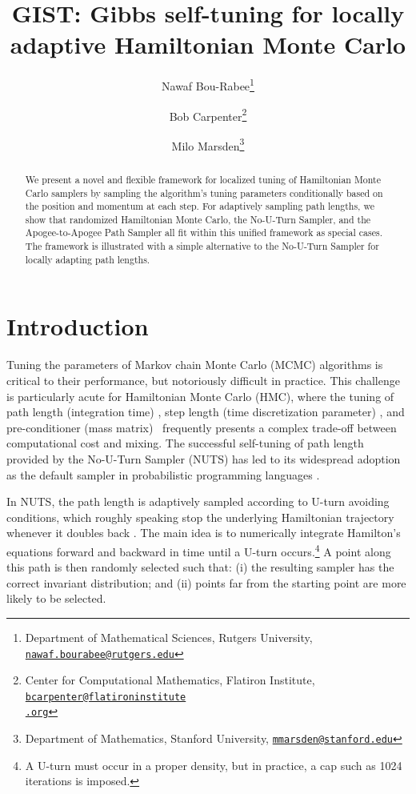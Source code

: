 \documentclass[letterpaper,11pt]{article}
\title{GIST: Gibbs self-tuning for locally  \\ 
adaptive Hamiltonian Monte Carlo}
\author{Nawaf Bou-Rabee\thanks{Department of Mathematical Sciences, Rutgers University, \href{mailto:nawaf.bourabee@rutgers.edu}{\texttt{nawaf.bourabee@rutgers.edu}}}
\and
Bob Carpenter\thanks{Center for Computational Mathematics, Flatiron Institute, \href{mailto:bcarpenter@flatironinstitute.org}{\texttt{bcarpenter@flatironinstitute\\.org}}}
\and
Milo Marsden\thanks{Department of Mathematics, Stanford University, 
\href{mailto:mmarsden@stanford.edu}{\texttt{mmarsden@stanford.edu}}}
}
\theoremstyle{plain}%
\theoremstyle{remark}
\begin{document}
\maketitle
\begin{abstract}
\noindent
We present a novel and flexible framework for localized tuning of Hamiltonian Monte Carlo samplers by sampling the algorithm's tuning parameters conditionally based on the position and momentum at each step. For adaptively sampling path lengths, we show that randomized Hamiltonian Monte Carlo, the No-U-Turn Sampler, and the Apogee-to-Apogee Path Sampler all fit within this unified framework as special cases.  The framework is illustrated with a simple alternative to the No-U-Turn Sampler for locally adapting path lengths.
\end{abstract}



\section{Introduction}

Tuning the parameters of Markov chain Monte Carlo (MCMC) algorithms is critical to their  performance, but notoriously difficult in practice.  This challenge is particularly acute for Hamiltonian Monte Carlo (HMC), where the tuning of path length (integration time) \cite{HoGe2014,BoSa2017,betancourt2017conceptual,kleppe2022connecting}, step length (time discretization parameter) \cite{BePiRoSaSt2013,betancourt2014optimizing,biron2024automala}, and pre-conditioner (mass matrix) \cite{GiCa2011,kleppe2016adaptive,whalley2024randomized}~frequently presents a complex trade-off between computational cost and mixing.   The successful self-tuning of path length provided by the No-U-Turn Sampler (NUTS) has led to its widespread adoption as the default sampler in probabilistic programming languages \cite{carpenter2016stan,salvatier2016probabilistic,nimble-article:2017,ge2018t,phan2019composable}.

In NUTS, the path length is adaptively sampled according to U-turn avoiding conditions, which roughly speaking stop the underlying Hamiltonian trajectory whenever it doubles back \cite{HoGe2014,betancourt2017conceptual}. The main idea is to numerically integrate Hamilton's equations forward and backward in time until a U-turn occurs.\footnote{A U-turn must occur in a proper density, but in practice, a cap such as 1024 iterations is imposed.}  A point along this path is then randomly selected such that: (i) the resulting sampler has the correct invariant distribution; and (ii) points far from the starting point are more likely to be selected.  %
\end{document}
